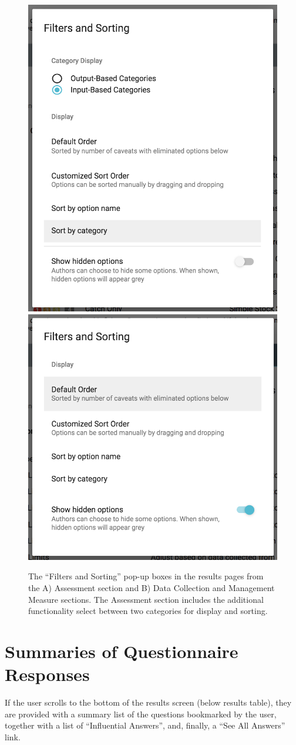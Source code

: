 \documentclass[11pt,]{book}
\begin{document}
\begin{figure}

{\centering \includegraphics[width=0.5\linewidth]{images/filter-and-sorting-assessment} \includegraphics[width=0.5\linewidth]{images/filter-and-sorting} 

}

\caption{The “Filters and Sorting” pop-up boxes in the results pages from the A) Assessment section and B) Data Collection and Management Measure sections. The Assessment section includes the additional functionality select between two categories for display and sorting.}\label{fig:filter-and-sorting}
\end{figure}

\hypertarget{summaries-of-questionnaire-responses}{%
\section{Summaries of Questionnaire Responses}\label{summaries-of-questionnaire-responses}}

If the user scrolls to the bottom of the results screen (below results table), they are provided with a summary list of the questions bookmarked by the user, together with a list of ``Influential Answers'', and, finally, a ``See All Answers'' link.
\end{document}
